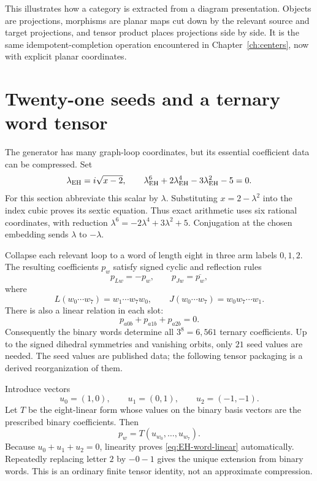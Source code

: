 This illustrates how a category is extracted from a diagram
presentation. Objects are projections, morphisms are planar
maps cut down by the relevant source and target projections,
and tensor product places projections side by side. It is the
same idempotent-completion operation encountered in
Chapter~\ref{ch:centers}, now with explicit planar coordinates.

\section{Twenty-one seeds and a ternary word tensor}

The generator has many graph-loop coordinates, but its essential
coefficient data can be compressed. Set
\begin{equation}
 \lambda_{\rm EH}=i\sqrt{x-2},\qquad
 \lambda_{\rm EH}^6+2\lambda_{\rm EH}^4
 -3\lambda_{\rm EH}^2-5=0.
 \label{eq:EH-coefficient-field}
\end{equation}
For this section abbreviate this scalar by $\lambda$. Substituting
$x=2-\lambda^2$ into the index cubic proves its sextic equation.
Thus exact arithmetic uses six rational coordinates, with reduction
$\lambda^6=-2\lambda^4+3\lambda^2+5$. Conjugation at the
chosen embedding sends $\lambda$ to $-\lambda$.

Collapse each relevant loop to a word of length eight in three
arm labels $0,1,2$. The resulting coefficients $p_w$ satisfy
signed cyclic and reflection rules
\begin{equation}
 p_{Lw}=-p_w,\qquad p_{Jw}=\overline{p_w},
 \label{eq:EH-word-symmetries}
\end{equation}
where
\[
 L(w_0\cdots w_7)=w_1\cdots w_7w_0,
 \qquad J(w_0\cdots w_7)=w_0w_7\cdots w_1.
\]
There is also a linear relation in each slot:
\begin{equation}
 p_{a0b}+p_{a1b}+p_{a2b}=0.
 \label{eq:EH-word-linear}
\end{equation}
Consequently the binary words determine all $3^8=6,561$ ternary
coefficients. Up to the signed dihedral symmetries and vanishing
orbits, only $21$ seed values are needed. The seed values are
published data; the following tensor packaging is a derived
reorganization of them.

Introduce vectors
\[
 u_0=(1,0),\qquad u_1=(0,1),\qquad u_2=(-1,-1).
\]
Let $T$ be the eight-linear form whose values on the binary
basis vectors are the prescribed binary coefficients. Then
\begin{equation}
 p_w=T(u_{w_0},\ldots,u_{w_7}).
 \label{eq:EH-multilinear-word}
\end{equation}
Because $u_0+u_1+u_2=0$, linearity proves
\eqref{eq:EH-word-linear} automatically. Repeatedly replacing
letter $2$ by $-0-1$ gives the unique extension from binary
words. This is an ordinary finite tensor identity, not an
approximate compression.

